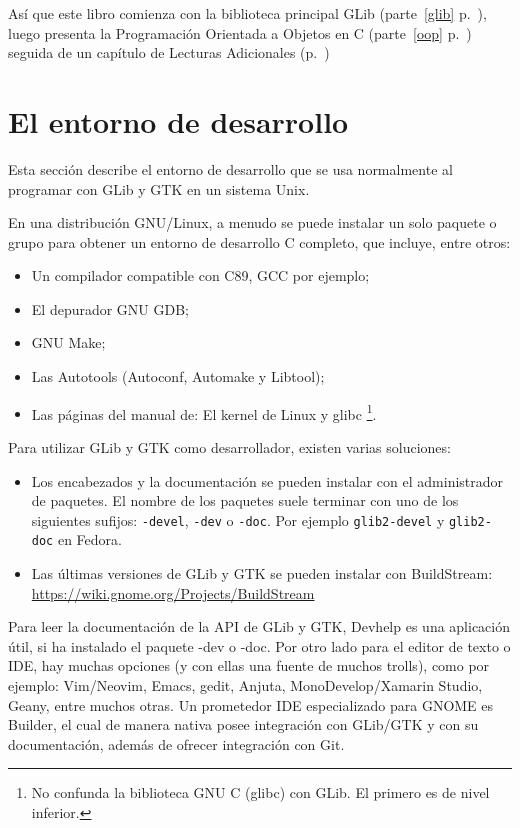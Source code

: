 Así que este libro comienza con la biblioteca principal GLib (parte~\ref{glib} p.~\pageref{glib}), luego presenta la Programación Orientada a Objetos en C (parte~\ref{oop} p.~\pageref{oop}) seguida de un capítulo de Lecturas Adicionales (p.~\pageref{further-reading})

\section{El entorno de desarrollo}
\label{intro-dev-environment}

Esta sección describe el entorno de desarrollo que se usa normalmente al programar con GLib y GTK en un sistema Unix.

En una distribución GNU/Linux, a menudo se puede instalar un solo paquete o grupo para obtener un entorno de desarrollo C completo, que incluye, entre otros:
\begin{itemize}
    \item Un compilador compatible con C89, GCC por ejemplo;
    \item El depurador GNU GDB;
    \item GNU Make;
    \item Las Autotools (Autoconf, Automake y Libtool);
    \item Las páginas del manual de: El kernel de Linux y glibc \footnote{No confunda la biblioteca GNU C (glibc) con GLib. El primero es de nivel inferior.}.
\end{itemize}

Para utilizar GLib y GTK como desarrollador, existen varias soluciones:
\begin{itemize}
    \item Los encabezados y la documentación se pueden instalar con el administrador de paquetes. El nombre de los paquetes suele terminar con uno de los siguientes sufijos: \texttt{-devel}, \texttt{-dev} o \texttt{-doc}. Por ejemplo \texttt{glib2-devel} y \texttt{glib2-doc} en Fedora.
    \item Las últimas versiones de GLib y GTK se pueden instalar con BuildStream:\\
    \url{https://wiki.gnome.org/Projects/BuildStream}
\end{itemize}

Para leer la documentación de la API de GLib y GTK, Devhelp es una aplicación útil, si ha instalado el paquete -dev o -doc. Por otro lado para el editor de texto o IDE, hay muchas opciones (y con ellas una fuente de muchos trolls), como por ejemplo: Vim/Neovim, Emacs, gedit, Anjuta, MonoDevelop/Xamarin Studio, Geany, entre muchos otras. Un prometedor IDE especializado para GNOME es Builder, el cual de manera nativa posee integración con GLib/GTK y con su documentación, además de ofrecer integración con Git.

